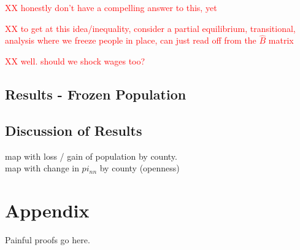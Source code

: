 \documentclass{article}
\begin{document}
\textcolor{red}{XX honestly don't have a compelling answer to this, yet}


\textcolor{red}{XX to get at this idea/inequality, consider a partial equilibrium, transitional, analysis where we freeze people in place, can just read off from the $\hat B$ matrix }

\textcolor{red}{XX well. should we shock wages too? }

\subsection{Results - Frozen Population}
\subsection{Discussion of Results}

map with loss / gain of population by county. \\
map with change in $pi_{nn}$ by county (openness)


\section{Appendix}
Painful proofs go here.


\end{document}
